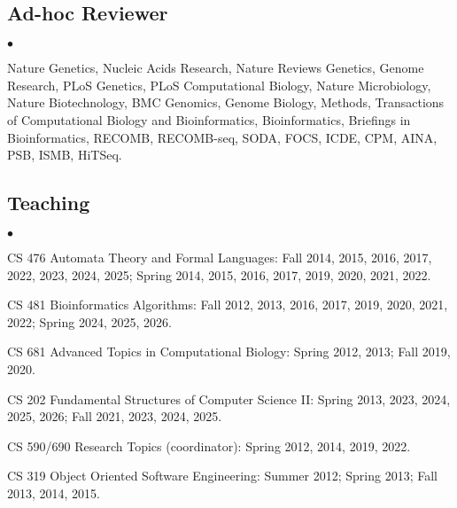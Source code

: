 \documentclass[margin,line]{res}
\newenvironment{list2}{
  \begin{list}{$\bullet$}{%
      \setlength{\itemsep}{0.1cm}
      \setlength{\parsep}{0in} \setlength{\parskip}{0in}
      \setlength{\topsep}{0in} \setlength{\partopsep}{0in} 
      \setlength{\leftmargin}{0.2in}}}{\end{list}}
\begin{document}
\begin{resume}
\vspace{-0.4cm}
\subsection{\small \sc Ad-hoc Reviewer}
\begin{list2}
\item
  Nature Genetics, Nucleic Acids Research, Nature Reviews Genetics, Genome Research, PLoS Genetics, PLoS Computational Biology, Nature Microbiology,
  Nature Biotechnology, BMC Genomics, Genome Biology, Methods, Transactions of Computational Biology and Bioinformatics,
  Bioinformatics, Briefings in Bioinformatics, RECOMB, RECOMB-seq, SODA, FOCS, ICDE, CPM, AINA, PSB, ISMB, HiTSeq.
\end{list2}

\vspace{-0.4cm}
\subsection{\small \sc Teaching}
\begin{list2}
  \item CS 476 Automata Theory and Formal Languages: Fall 2014, 2015, 2016, 2017, 2022, 2023, 2024, 2025; Spring 2014, 2015, 2016, 2017, 2019, 2020, 2021, 2022. 
  \item CS 481 Bioinformatics Algorithms: Fall 2012, 2013, 2016, 2017, 2019, 2020, 2021, 2022; Spring 2024, 2025, 2026.
  \item CS 681 Advanced Topics in Computational Biology: Spring 2012, 2013; Fall 2019, 2020.
  \item CS 202 Fundamental Structures of Computer Science II: Spring 2013, 2023, 2024, 2025, 2026; Fall 2021, 2023, 2024, 2025.
  \item CS 590/690 Research Topics (coordinator): Spring 2012, 2014, 2019, 2022.
  \item CS 319 Object Oriented Software Engineering: Summer 2012; Spring 2013; Fall 2013, 2014, 2015.
\end{list2}


\vspace{-0.4cm}

\end{resume}
\end{document}
